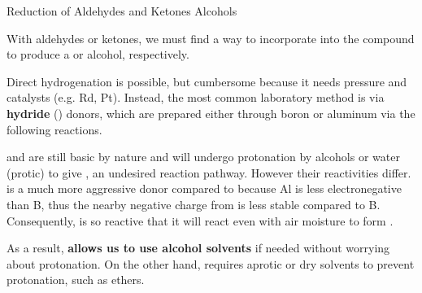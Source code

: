 \documentclass[10pt]{article}
\begin{document}
  \begin{core}{Reduction of Aldehydes and Ketones \rightarrow Alcohols}

    With aldehydes or ketones, we must find a way to incorporate  into the compound to produce a  or  alcohol, respectively.


    Direct hydrogenation is possible, but cumbersome because it needs  pressure and catalysts (e.g. Rd, Pt). Instead, the most common laboratory method is via \textbf{hydride} () donors, which are prepared either through boron or aluminum via the following reactions.



     and  are still basic by nature and will undergo protonation by alcohols or water (protic) to give , an undesired reaction pathway. However their reactivities differ.  is a much more aggressive  donor compared to  because Al is less electronegative than B, thus the nearby negative charge from  is less stable compared to B. Consequently,  is so reactive that it will react even with air moisture to form .

    As a result,  \textbf{allows us to use alcohol solvents} if needed without worrying about protonation. On the other hand,  requires aprotic or dry solvents to prevent protonation, such as ethers.



\end{core}
\end{document}
